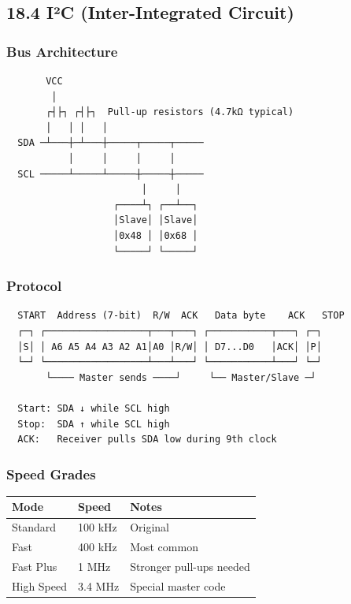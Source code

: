 \documentclass[11pt,a4paper]{book}
\begin{document}
\begin{itemize}
\medskip\noindent\hrulefill\medskip

\subsection{18.4 I²C (Inter-Integrated Circuit)}

\subsubsection{Bus Architecture}

\begin{lstlisting}
       VCC
        │
       ┌┤├┐ ┌┤├┐  Pull-up resistors (4.7kΩ typical)
       │   │ │   │
  SDA ─┴───┼─┴───┼─────┬─────┬─────
           │     │     │     │
  SCL ─────┴─────┴─────┼─────┼─────
                        │     │
                   ┌────┴┐ ┌──┴──┐
                   │Slave│ │Slave│
                   │0x48 │ │0x68 │
                   └─────┘ └─────┘
\end{lstlisting}

\subsubsection{Protocol}

\begin{lstlisting}
  START  Address (7-bit)  R/W  ACK   Data byte    ACK   STOP
  ┌─┐ ┌──────────────────┬───┬───┐ ┌───────────┬───┐ ┌─┐
  │S│ │ A6 A5 A4 A3 A2 A1│A0 │R/W│ │ D7...D0   │ACK│ │P│
  └─┘ └──────────────────┴───┴───┘ └───────────┴───┘ └─┘
       └──── Master sends ────┘     └── Master/Slave ─┘
  
  Start: SDA ↓ while SCL high
  Stop:  SDA ↑ while SCL high
  ACK:   Receiver pulls SDA low during 9th clock
\end{lstlisting}

\subsubsection{Speed Grades}

\begin{center}
\begin{tabular}{|l|l|l|}
\hline
Mode & Speed & Notes \\
\hline
Standard & 100 kHz & Original \\
Fast & 400 kHz & Most common \\
Fast Plus & 1 MHz & Stronger pull-ups needed \\
High Speed & 3.4 MHz & Special master code \\
\hline
\end{tabular}
\end{center}


\end{itemize}
\end{document}
